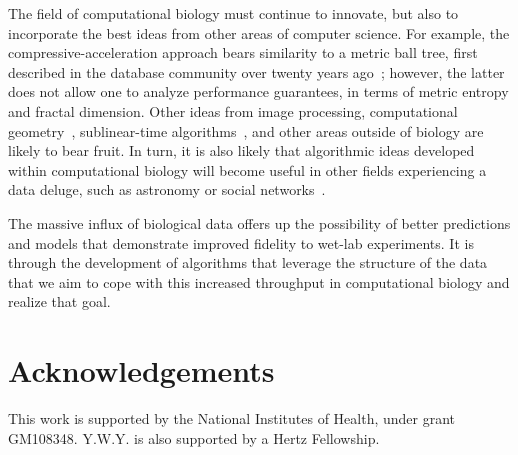 \documentclass{acm_proc_article-sp}
\begin{document}
The field of computational biology must continue to innovate, but also to 
incorporate the best ideas from other areas of computer science.
For example, the compressive-acceleration approach bears similarity to a metric 
ball tree, first described in the database community over twenty years 
ago~\cite{uhlmann1991satisfying};
however, the latter does not allow one to analyze performance guarantees, 
in terms of metric entropy and fractal dimension.
Other ideas from image processing, computational geometry~\cite{indyk1998approximate}, sublinear-time algorithms~\cite{rubinfeld2011sublinear}, and other areas 
outside of biology are likely to bear fruit. 
In turn, it is also likely that algorithmic ideas developed within computational biology
will become useful in other fields experiencing a data deluge, such as astronomy
or social networks~\cite{stephens2015big}.

The massive influx of biological data offers up the possibility of better
predictions and models that demonstrate improved fidelity to wet-lab 
experiments.
It is through the development of algorithms that leverage the
structure of the data that we aim to cope with this increased throughput in computational 
biology and realize that goal.

\section{Acknowledgements}
This work is supported by the National Institutes of Health, under
grant GM108348.
Y.W.Y. is also supported by a Hertz Fellowship.






\end{document}
